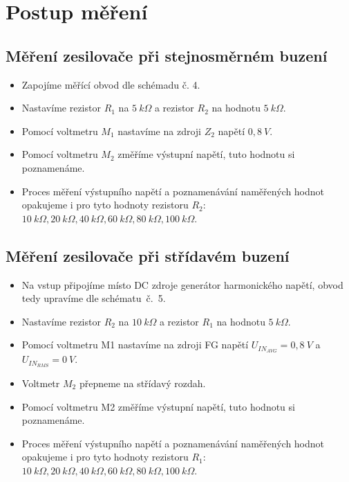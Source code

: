 \section{Postup měření}
  \subsection{Měření zesilovače při stejnosměrném buzení}
    \begin{itemize}
      \item
        Zapojíme měřící obvod dle schémadu č. 4.
      \item
      	Nastavíme rezistor $R_1$ na $5~k\Omega$ a rezistor $R_2$ na hodnotu $5~k\Omega$.
      \item
        Pomocí voltmetru $M_1$ nastavíme na zdroji $Z_2$ napětí $0,8~V$.
      \item
        Pomocí voltmetru $M_2$ změříme výstupní napětí, tuto hodnotu si poznamenáme.
      \item
        Proces měření výstupního napětí a poznamenávání naměřených hodnot opakujeme i pro tyto hodnoty rezistoru $R_2$: $10~k\Omega, 20~k\Omega, 40~k\Omega, 60~k\Omega, 80~k\Omega, 100~k\Omega$.
		\end{itemize}
		
	\subsection{Měření zesilovače při střídavém buzení}
    \begin{itemize}
      \item
        Na vstup připojíme místo DC zdroje generátor harmonického napětí, obvod tedy upravíme dle schématu~č.~5.
      \item
      	Nastavíme rezistor $R_2$ na $10~k\Omega$ a rezistor $R_1$ na hodnotu $5~k\Omega$.
      \item
        Pomocí voltmetru M1 nastavíme na zdroji FG napětí $U_{IN_{AVG}} = 0,8~V$ a $U_{IN_{RMS}} = 0~V$.
      \item
        Voltmetr $M_2$ přepneme na střídavý rozdah.
      \item
      	Pomocí voltmetru M2 změříme výstupní napětí, tuto hodnotu si poznamenáme.
      \item
        Proces měření výstupního napětí a poznamenávání naměřených hodnot opakujeme i pro tyto hodnoty rezistoru $R_1$: $10~k\Omega, 20~k\Omega, 40~k\Omega, 60~k\Omega, 80~k\Omega, 100~k\Omega$.
		\end{itemize}
		
